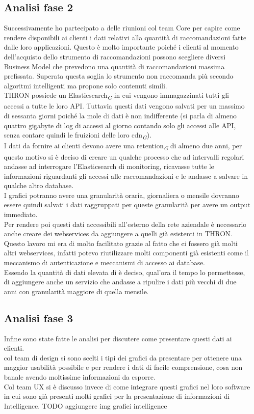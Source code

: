\documentclass[a4paper, 12pt, twoside, openright]{book}
\newcommand{\gloss}[1]{#1\textsubscript{\textit{\tiny{G}}}}
\begin{document}
\subsection{Analisi fase 2}
Successivamente ho partecipato a delle riunioni col team Core per capire come rendere disponibili ai clienti i dati relativi alla quantità di raccomandazioni fatte dalle loro applicazioni. Questo è molto importante poiché i clienti al momento dell'acquisto dello strumento di raccomandazioni possono scegliere diversi Business Model che prevedono una quantità di raccomandazioni massima prefissata. Superata questa soglia lo strumento non raccomanda più secondo algoritmi intelligenti ma propone solo contenuti simili.\\
THRON possiede un \gloss{Elasticsearch} in cui vengono immagazzinati tutti gli accessi a tutte le loro API. Tuttavia questi dati vengono salvati per un massimo di sessanta giorni poiché la mole di dati è non indifferente (si parla di almeno quattro gigabyte di log di accessi al giorno contando solo gli accessi alle API, senza contare quindi le fruizioni delle loro \gloss{cdn}).\\I dati da fornire ai clienti devono avere una \gloss{retention} di almeno due anni, per questo motivo si è deciso di creare un qualche processo che ad intervalli regolari andasse ad interrogare l'Elasticsearch di monitoring, ricavasse tutte le informazioni riguardanti gli accessi alle raccomandazioni e le andasse a salvare in qualche altro database.\\I grafici potranno avere una granularità oraria, giornaliera o mensile dovranno essere quindi salvati i dati raggruppati per queste granularità per avere un output immediato.\\Per rendere poi questi dati accessibili all'esterno della rete aziendale è necessario anche creare dei webservices da aggiungere a quelli già esistenti in THRON. Questo lavoro mi era di molto facilitato grazie al fatto che ci fossero già molti altri webservices, infatti potevo riutilizzare molti componenti già esistenti come il meccanismo di autenticazione e meccanismi di accesso ai database.\\
Essendo la quantità di dati elevata di è deciso, qual'ora il tempo lo permettesse, di aggiungere anche un servizio che andasse a ripulire i dati più vecchi di due anni con granularità maggiore di quella mensile.

\subsection{Analisi fase 3}
Infine sono state fatte le analisi per discutere come presentare questi dati ai clienti.\\
col team di design si sono scelti i tipi dei grafici da presentare per ottenere una maggior usabilità possibile e per rendere i dati di facile comprensione, cosa non banale avendo moltissime informazioni da esporre.\\
Col team UX si è discusso invece di come integrare questi grafici nel loro software in cui sono già presenti molti grafici per la presentazione di informazioni di Intelligence. TODO aggiungere img grafici intelligence\\
\end{document}

